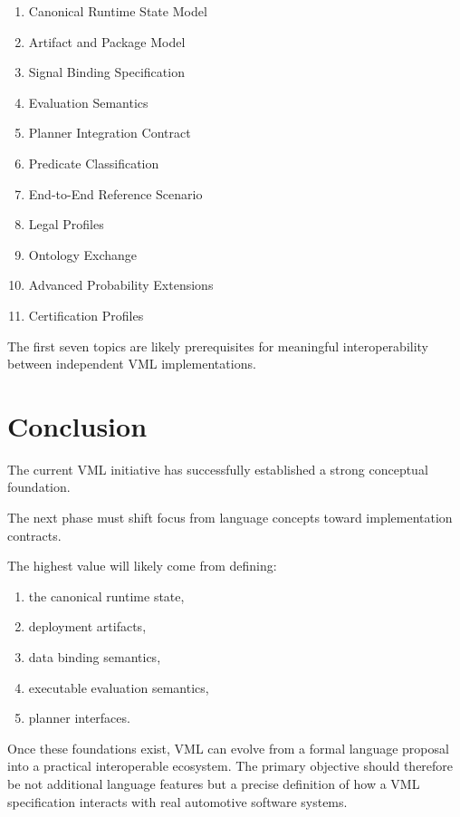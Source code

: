 \documentclass[a4paper,11pt]{article}
\begin{document}
\begin{enumerate}

\item Canonical Runtime State Model

\item Artifact and Package Model

\item Signal Binding Specification

\item Evaluation Semantics

\item Planner Integration Contract

\item Predicate Classification

\item End-to-End Reference Scenario

\item Legal Profiles

\item Ontology Exchange

\item Advanced Probability Extensions

\item Certification Profiles

\end{enumerate}

The first seven topics are likely prerequisites
for meaningful interoperability between independent VML
implementations.

\section{Conclusion}

The current VML initiative has successfully established
a strong conceptual foundation.

The next phase must shift focus from language concepts
toward implementation contracts.

The highest value will likely come from defining:

\begin{enumerate}
\item the canonical runtime state,
\item deployment artifacts,
\item data binding semantics,
\item executable evaluation semantics,
\item planner interfaces.
\end{enumerate}

Once these foundations exist,
VML can evolve from a formal language proposal
into a practical interoperable ecosystem.
The primary objective should therefore be not additional language
features but a precise definition of how a VML specification
interacts with real automotive software systems.
\end{document}
